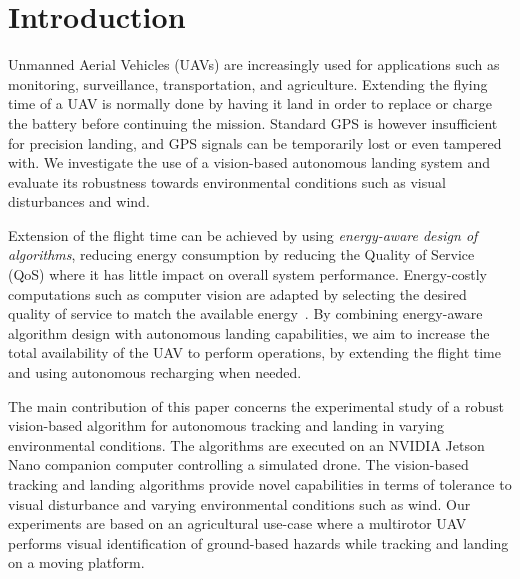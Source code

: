 \documentclass[conference]{IEEEtran}
\begin{document}
\section{Introduction}
\label{sec:introduction}

Unmanned Aerial Vehicles (UAVs) are increasingly used for applications
such as monitoring, surveillance, transportation,
and agriculture. %
%
Extending the flying time of a UAV is normally done by having it land
in order to replace or charge the battery before continuing the
mission. 
%
Standard GPS is however insufficient for precision landing, and 
GPS signals can be temporarily lost or even tampered with. 
We investigate the use of a 
vision-based autonomous landing system and evaluate its robustness
towards environmental conditions such as visual disturbances and wind.

Extension of the flight time can be achieved by using
\emph{energy-aware design of algorithms}, reducing energy consumption
by reducing the Quality of Service (QoS) where it has little impact on overall system performance. 
Energy-costly computations such as computer vision are adapted by
selecting the desired quality of service to match the available
energy~\cite{seewald2020mechanical}. By combining energy-aware algorithm design with autonomous landing
capabilities, we aim to increase the total availability of the UAV to
perform operations, by extending the flight time and using autonomous
recharging when needed.


The main contribution of this paper concerns the experimental study of
a robust vision-based algorithm for autonomous
tracking and landing in varying environmental conditions. The
algorithms are executed on an NVIDIA Jetson Nano companion computer
controlling a simulated drone. The vision-based tracking and landing
algorithms provide novel capabilities in terms of tolerance to visual
disturbance and varying environmental conditions such as wind.
%
Our experiments are based on an agricultural use-case where a
multirotor UAV performs visual identification of ground-based hazards
while tracking and landing on a moving platform.
%
\end{document}
